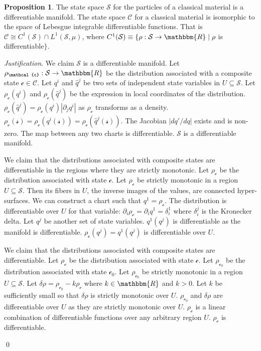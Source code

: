 \documentclass[aps,pra,10pt,twocolumn,floatfix,nofootinbib]{revtex4-1}
\numberwithin{equation}{section}
\theoremstyle{definition}
\newtheorem{prop}[equation]{Proposition}
\newenvironment{justification}{\emph{Justification}.}{\qed}
\begin{document}
\begin{prop}\label{prop:differentiable_manifold}
	The state space $\mathcal{S}$ for the particles of a  classical material is a differentiable manifold. The state space $\mathcal{C}$ for a classical material is isomorphic to the space of Lebesgue integrable differentiable functions. That is $\mathcal{C} \cong C^1(\mathcal{S}) \cap L^1(\mathcal{S}, \mu)$, where $C^1(\mathcal{S}) \equiv \{\rho:\mathcal{S} \rightarrow \mathbbm{R} \; | \; \rho$ is differentiable$\}$.
\end{prop}
\begin{justification}
	We claim $\mathcal{S}$ is a differentiable manifold. Let $\rho_\mathcal{c} : \mathcal{S} \rightarrow \mathbbm{R}$ be the distribution associated with a composite state $\mathcal{c} \in \mathcal{C}$. Let $q^i$ and $\hat{q}^j$ be two sets of independent state variables in $U\subseteq \mathcal{S}$. Let $\rho_\mathcal{c}(q^i)$ and $\rho_\mathcal{c}(\hat{q}^j)$ be the expression in local coordinates of the distribution.  $\rho_\mathcal{c}(\hat{q}^j)=\rho_\mathcal{c}(q^i) | \partial_j q^i |$ as $\rho_\mathcal{c}$ transforms as a density. $\rho_\mathcal{c}(\mathcal{s}) = \rho_\mathcal{c}(q^i(\mathcal{s})) = \rho_\mathcal{c}(\hat{q}^j(\mathcal{s}))$. The Jacobian $| d q' / d q |$ exists and is non-zero. The map between any two charts is differentiable. $\mathcal{S}$ is a differentiable manifold.
	
	We claim that the distributions associated with composite states are differentiable in the regions where they are strictly monotonic. Let $\rho_\mathcal{c}$ be the distribution associated with state $\mathcal{c}$. Let $\rho_\mathcal{c}$ be strictly monotonic in a region $U\subseteq \mathcal{S}$. Then its fibers in $U$, the inverse images of the values, are connected hyper-surfaces. We can construct a chart such that $q^1=\rho_\mathcal{c}$. The distribution is differentiable over $U$ for that variable: $\partial_{i} \rho_\mathcal{c} = \partial_{i} q^1 = \delta_i^1$ where $\delta_i^j$ is the Kronecker delta. Let $q^{j}$ be another set of state variables. $q^1(q^{j})$ is differentiable as the manifold is differentiable. $\rho_\mathcal{c}(q^{j})=q^1(q^{j})$ is differentiable over $U$.
	
	We claim that the distributions associated with composite states are differentiable. Let $\rho_\mathcal{c}$ be the distribution associated with state $\mathcal{c}$. Let $\rho_{\mathcal{c}_0}$ be the distribution associated with state $\mathcal{c}_0$. Let $\rho_{\mathcal{c}_0}$ be strictly monotonic in a region $U\subseteq \mathcal{S}$. Let $\delta \rho = \rho_{\mathcal{c}_0} - k \rho_{\mathcal{c}}$ where $k \in \mathbbm{R}$ and $k>0$. Let $k$ be sufficiently small so that $\delta \rho$ is strictly monotonic over $U$. $\rho_{\mathcal{c}_0}$ and $\delta \rho$ are differentiable over $U$ as they are strictly monotonic over $U$. $\rho_{\mathcal{c}}$ is a linear combination of differentiable functions over any arbitrary region $U$. $\rho_{\mathcal{c}}$ is differentiable.
	

\end{justification}
\end{document}

